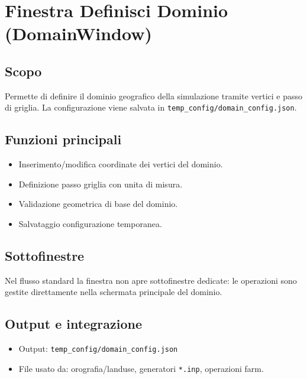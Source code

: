 \chapter{Finestra Definisci Dominio (DomainWindow)}

\section{Scopo}
Permette di definire il dominio geografico della simulazione tramite vertici e passo di griglia.
La configurazione viene salvata in \texttt{temp\_config/domain\_config.json}.

\section{Funzioni principali}
\begin{itemize}[leftmargin=1.5em]
  \item Inserimento/modifica coordinate dei vertici del dominio.
  \item Definizione passo griglia con unita di misura.
  \item Validazione geometrica di base del dominio.
  \item Salvataggio configurazione temporanea.
\end{itemize}

\section{Sottofinestre}
Nel flusso standard la finestra non apre sottofinestre dedicate: le operazioni sono gestite direttamente nella schermata principale del dominio.

\section{Output e integrazione}
\begin{itemize}[leftmargin=1.5em]
  \item Output: \texttt{temp\_config/domain\_config.json}
  \item File usato da: orografia/landuse, generatori \texttt{*.inp}, operazioni farm.
\end{itemize}
